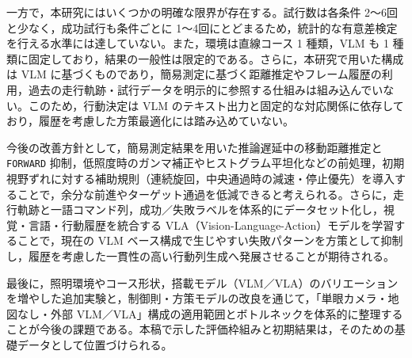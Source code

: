 \documentclass[a4paper,11pt]{ltjsreport}
\begin{document}
一方で，本研究にはいくつかの明確な限界が存在する。試行数は各条件 2〜6回と少なく，成功試行も条件ごとに 1〜4回にとどまるため，統計的な有意差検定を行える水準には達していない。また，環境は直線コース 1 種類，VLM も 1 種類に固定しており，結果の一般性は限定的である。さらに，本研究で用いた構成は VLM に基づくものであり，簡易測定に基づく距離推定やフレーム履歴の利用，過去の走行軌跡・試行データを明示的に参照する仕組みは組み込んでいない。このため，行動決定は VLM のテキスト出力と固定的な対応関係に依存しており，履歴を考慮した方策最適化には踏み込めていない。

今後の改善方針として，簡易測定結果を用いた推論遅延中の移動距離推定と \texttt{FORWARD} 抑制，低照度時のガンマ補正やヒストグラム平坦化などの前処理，初期視野ずれに対する補助規則（連続旋回，中央通過時の減速・停止優先）を導入することで，余分な前進やターゲット通過を低減できると考えられる。さらに，走行軌跡と一語コマンド列，成功／失敗ラベルを体系的にデータセット化し，視覚・言語・行動履歴を統合する VLA（Vision-Language-Action）モデルを学習することで，現在の VLM ベース構成で生じやすい失敗パターンを方策として抑制し，履歴を考慮した一貫性の高い行動列生成へ発展させることが期待される。

最後に，照明環境やコース形状，搭載モデル（VLM／VLA）のバリエーションを増やした追加実験と，制御則・方策モデルの改良を通じて，「単眼カメラ・地図なし・外部 VLM／VLA」構成の適用範囲とボトルネックを体系的に整理することが今後の課題である。本稿で示した評価枠組みと初期結果は，そのための基礎データとして位置づけられる。




\end{document}
